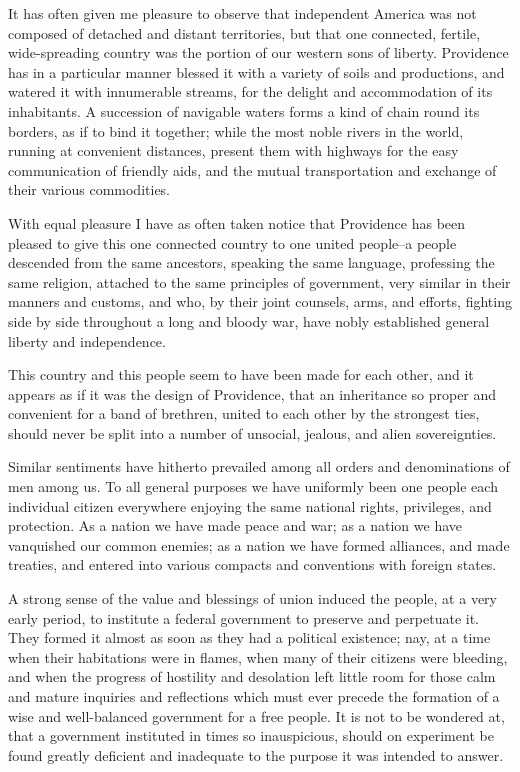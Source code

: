 It has often given me pleasure to observe that independent America was not composed of detached and distant territories, but that one connected, fertile, wide-spreading country was the portion of our western sons of liberty. 
Providence has in a particular manner blessed it with a variety of soils and productions, and watered it with innumerable streams, for the delight and accommodation of its inhabitants. 
A succession of navigable waters forms a kind of chain round its borders, as if to bind it together; while the most noble rivers in the world, running at convenient distances, present them with highways for the easy communication of friendly aids, and the mutual transportation and exchange of their various commodities.

With equal pleasure I have as often taken notice that Providence has been pleased to give this one connected country to one united people--a people descended from the same ancestors, speaking the same language, professing the same religion, attached to the same principles of government, very similar in their manners and customs, and who, by their joint counsels, arms, and efforts, fighting side by side throughout a long and bloody war, have nobly established general liberty and independence.

This country and this people seem to have been made for each other, and it appears as if it was the design of Providence, that an inheritance so proper and convenient for a band of brethren, united to each other by the strongest ties, should never be split into a number of unsocial, jealous, and alien sovereignties.

Similar sentiments have hitherto prevailed among all orders and denominations of men among us. 
To all general purposes we have uniformly been one people each individual citizen everywhere enjoying the same national rights, privileges, and protection. 
As a nation we have made peace and war; as a nation we have vanquished our common enemies; as a nation we have formed alliances, and made treaties, and entered into various compacts and conventions with foreign states.

A strong sense of the value and blessings of union induced the people, at a very early period, to institute a federal government to preserve and perpetuate it. 
They formed it almost as soon as they had a political existence; nay, at a time when their habitations were in flames, when many of their citizens were bleeding, and when the progress of hostility and desolation left little room for those calm and mature inquiries and reflections which must ever precede the formation of a wise and well-balanced government for a free people. 
It is not to be wondered at, that a government instituted in times so inauspicious, should on experiment be found greatly deficient and inadequate to the purpose it was intended to answer.

